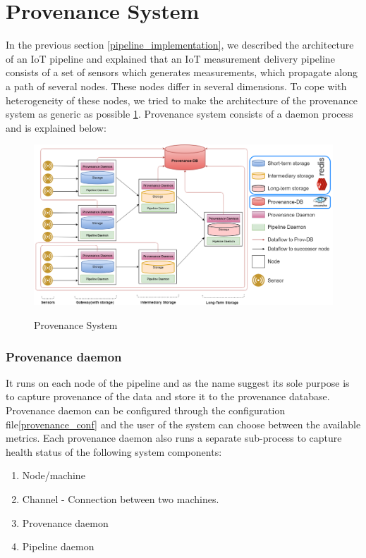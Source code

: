 \section{Provenance System}

In the previous section \ref{pipeline_implementation}, we described the architecture of an IoT pipeline and explained that an IoT measurement delivery pipeline consists of a set of sensors which generates measurements, which propagate along a path of several nodes. These nodes differ in several dimensions. To cope with heterogeneity of these nodes, we tried to make the architecture of the provenance system as generic as possible \ref{provenance_system}.
Provenance system consists of a daemon process and is explained below:

\begin{figure}[h]
\centering
\includegraphics[width=\linewidth]{figures/provenance_system.png}\\
\caption{Provenance System}
\label{provenance_system}
\end{figure}

\subsubsection {Provenance daemon}
It runs on each node of the pipeline and as the name suggest its sole purpose is to capture provenance of the data and store it to the provenance database. Provenance daemon can be configured through the configuration file\ref{provenance_conf} and the user of the system can choose between the available metrics.
Each provenance daemon also runs a separate sub-process to capture health status of the following system components:
\begin{enumerate}
	\item Node/machine
	\item Channel - Connection between two machines.
	\item Provenance daemon
	\item Pipeline daemon
\end{enumerate}

